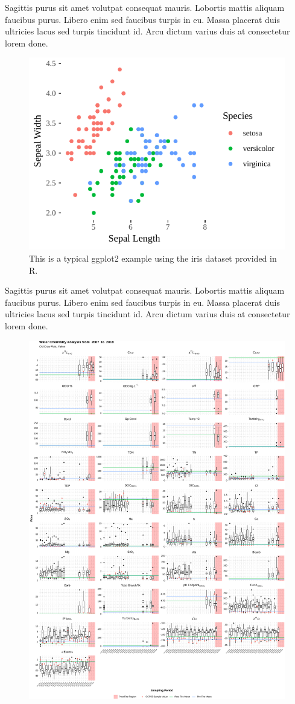 \documentclass[article,30pt,extrafontsizes]{memoir}
\begin{document}
\begin{multicols*}{3}
{Sagittis purus sit amet volutpat consequat mauris. Lobortis mattis
aliquam faucibus purus. Libero enim sed faucibus turpis in eu. Massa
placerat duis ultricies lacus sed turpis tincidunt id. Arcu dictum
varius duis at consectetur lorem done.

\begin{figure}

{\centering \includegraphics[width=0.6\linewidth]{skeleton_files/figure-latex/unnamed-chunk-3-1} 

}

\caption{This is a typical ggplot2 example using the iris dataset provided in R.}\label{fig:unnamed-chunk-3}
\end{figure}

Sagittis purus sit amet volutpat consequat mauris. Lobortis mattis
aliquam faucibus purus. Libero enim sed faucibus turpis in eu. Massa
placerat duis ultricies lacus sed turpis tincidunt id. Arcu dictum
varius duis at consectetur lorem done.

\begin{figure}

{\centering \includegraphics[width=0.8\linewidth]{Figures/figure2} 

}
\end{figure}}
\end{multicols*}
\end{document}
